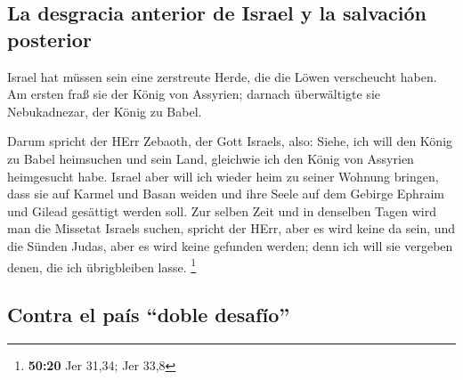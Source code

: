 \hypertarget{la-desgracia-anterior-de-israel-y-la-salvaciuxf3n-posterior}{%
\subsection{La desgracia anterior de Israel y la salvación
posterior}\label{la-desgracia-anterior-de-israel-y-la-salvaciuxf3n-posterior}}

 Israel hat müssen sein eine zerstreute Herde, die die
Löwen verscheucht haben. Am ersten fraß sie der König von Assyrien;
darnach überwältigte sie Nebukadnezar, der König zu Babel.

 Darum spricht der HErr Zebaoth, der Gott Israels, also:
Siehe, ich will den König zu Babel heimsuchen und sein Land, gleichwie
ich den König von Assyrien heimgesucht habe.  Israel aber
will ich wieder heim zu seiner Wohnung bringen, dass sie auf Karmel und
Basan weiden und ihre Seele auf dem Gebirge Ephraim und Gilead gesättigt
werden soll.  Zur selben Zeit und in denselben Tagen wird
man die Missetat Israels suchen, spricht der HErr, aber es wird keine da
sein, und die Sünden Judas, aber es wird keine gefunden werden; denn ich
will sie vergeben denen, die ich übrigbleiben lasse. \footnote{\textbf{50:20}
  Jer 31,34; Jer 33,8}

\hypertarget{contra-el-pauxeds-doble-desafuxedo}{%
\subsection{Contra el país ``doble
desafío''}\label{contra-el-pauxeds-doble-desafuxedo}}

